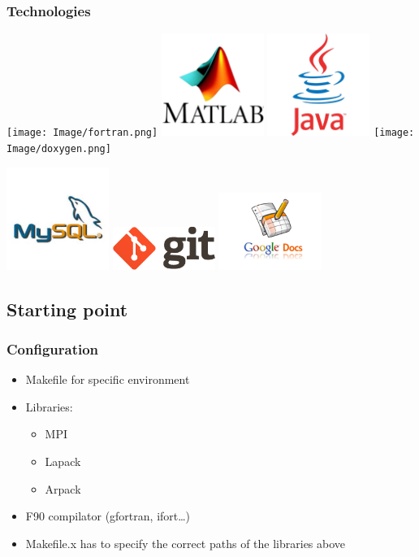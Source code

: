 \documentclass[10p]{beamer}
\begin{document}
\begin{frame}
\frametitle{Technologies}
\texttt{[image: Image/fortran.png]}
\includegraphics[width=0.25\textwidth]{Image/matlab.png}
\includegraphics[width=0.25\textwidth]{Image/java.png}
\texttt{[image: Image/doxygen.png]}\\
\begin{center}
\includegraphics[width=0.25\textwidth]{Image/mysql.png}
\includegraphics[width=0.25\textwidth]{Image/git.png}
\includegraphics[width=0.25\textwidth]{Image/GoogleDocs1.png}
\end{center}
\end{frame}
\subsection{Starting point}
\begin{frame}
\frametitle{Configuration}
\begin{itemize}
\item Makefile for specific environment
\item Libraries:
\begin{itemize}
\item MPI
\item Lapack
\item Arpack
\end{itemize}
\item F90 compilator (gfortran, ifort…)
\item Makefile.x has to specify the correct paths of the libraries above
\end{itemize}
\end{frame}
\end{document}
